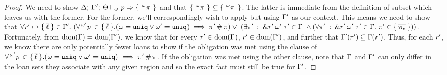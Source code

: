 \begin{proof}
  We need to show $\Delta; \: \Gamma^\prime; \: \Theta \vdash_{\omega} p \Rightarrow 
    \{ \: \,^{\omega}\pi\, \: \}
  $ and that
  $\{ \: \,^{\omega}\pi\, \: \} \subseteq \{ \: \,^{\omega}\pi\, \: \}$.
  The latter is immediate from the definition of subset which leaves us with the former.
  For the former, we'll correspondingly wish to apply  but using
  $\Gamma^\prime$ as our context. This means we need to show that
  $\forall r^\prime \mapsto \{ \: \overline{\ell} \: \} \in \Gamma^\prime.
  \; (\forall \,^{\omega^\prime}p\, \in \{ \: \overline{\ell} \: \}.
  (\omega = \mathtt{uniq} \vee \omega^\prime = \mathtt{uniq})
  \implies
  \pi^\prime \, \# \, \pi) \vee \;
  (\exists \pi^\prime \: : \: \& r^\prime \: \omega^\prime \: \tau^\prime \in \Gamma \;
  \wedge
  (\forall \pi^\prime \: : \: \& r^\prime \: \omega^\prime \: \tau^\prime \in \Gamma. \;
  \pi^\prime \in \{ \: 
    \overline{\pi_e}
   \: \}))$. Fortunately, from $\textrm{dom}(\Gamma) = \textrm{dom}(\Gamma^\prime)$, we know that
  for every $r^\prime \in \textrm{dom}(\Gamma)$, $r^\prime \in
  \textrm{dom}(\Gamma^\prime)$, and further that $\Gamma^\prime(r^\prime)
  \subseteq \Gamma(r^\prime)$. Thus, for each $r^\prime$, we know there are only
  potentially fewer loans to show if the obligation was met using the clause of
  $\forall \,^{\omega^\prime}p\, \in \{ \: \overline{\ell} \: \}.
  (\omega = \mathtt{uniq} \vee \omega^\prime = \mathtt{uniq})
  \implies \pi^\prime \, \# \, \pi$. If the obligation was met using the other
  clause, note that $\Gamma$ and $\Gamma^\prime$ can only differ in the loan sets they
  associate with any given region and so the exact fact must still be true for
  $\Gamma^\prime$.

  \vspace{1em}
  \noindent \framebox[\textwidth]{
    \figuresize
    \begin{mathpar}
      \ODeref
    \end{mathpar}
  }
  \vspace{1em}


\end{proof}
